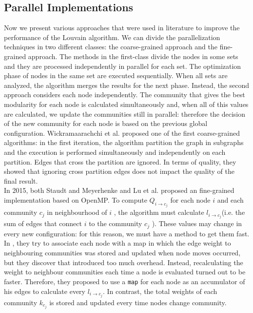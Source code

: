 \subsection{Parallel Implementations}\label{parallel-imp}
Now we present various approaches that were used in literature to improve the performance of the Louvain algorithm. We can divide the parallelization techniques
in two different classes: the coarse-grained approach and the fine-grained approach.
The methods in the first-class divide the nodes in some sets and they
are processed independently in parallel for each set. The optimization phase of nodes in the same set are executed sequentially. When all sets are analyzed,
the algorithm merges the results for the next phase. Instead, the second approach
considers each node independently. The community that gives the best modularity for each node is calculated simultaneously and, when all of this values are calculated, we update the communities still in parallel: therefore the decision of the new community for each node is
based on the previous global configuration. Wickramaarachchi et al. \cite{wickramaarachchi2014fast} proposed one of
the first coarse-grained algorithms: in the first iteration, the algorithm partition the graph
in subgraphs and the execution is performed simultaneously and independently
on each partition. Edges that cross the partition are ignored. In terms of quality,
they showed that ignoring cross partition edges does not impact the quality
of the final result.\\
In 2015, both Staudt and Meyerhenke  \cite{staudt2015engineering} and Lu et al. \cite{lu2015parallel} proposed an fine-grained implementation based on OpenMP. To compute $Q_{i \rightarrow c_j}$ for each node $i$ and each community $c_j$ in neighbourhood of $i$ , the algorithm  must calculate $l_{i\rightarrow c_j}$(i.e. the sum of edges that connect $i$ to the community $c_j$ ). These values may change in every new configuration: for this reason, we must have a method to get them fast. In \cite{staudt2015engineering}, they try to associate each node with a map in which the edge weight to neighbouring communities was stored and updated when node moves occurred, but they discover that introduced too much overhead.
Instead, recalculating the weight to neighbour communities each time a node is evaluated turned out to be faster. Therefore, they proposed to use a \verb|map| for each node as an accumulator of his edges to calculate every $l_{i\rightarrow c_j}$. In contrast, the total weights of each community $k_{c_j}$ is stored and updated every time nodes change community. 
